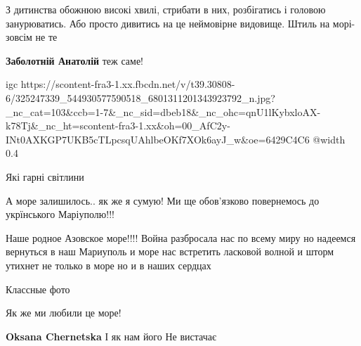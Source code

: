  
 
 
 
 

\qqSecCmt


З дитинства обожнюю високі хвилі, стрибати в них, розбігатись і головою
занурюватись. Або просто дивитись на це неймовірне видовище. Штиль на
морі-зовсім не те

\begin{itemize} %
\textbf{Заболотній Анатолій} теж саме!
\end{itemize} %


\ifcmt
  igc https://scontent-fra3-1.xx.fbcdn.net/v/t39.30808-6/325247339_544930577590518_6801311201343923792_n.jpg?_nc_cat=103&ccb=1-7&_nc_sid=dbeb18&_nc_ohc=qnU1lKybxloAX-k78Tj&_nc_ht=scontent-fra3-1.xx&oh=00_AfC2y-INt0AXKGP7UKB5cTLpcsqUAhlbeOKf7XOk6ayJ_w&oe=6429C4C6
	@width 0.4
\fi


Які гарні світлини


А море залишилось.. як же я сумую! Ми ще обов'язково повернемось до укрїнського Маріуполю!!!


Наше родное Азовское море!!!! Война разбросала нас по всему миру но надеемся
вернуться в наш Мариуполь и море нас встретить ласковой волной и шторм утихнет
не только в море но и в наших сердцах


Классные фото


Як же ми любили це море!

\begin{itemize} %
\textbf{Oksana Chernetska} І як нам його Не вистачає
\end{itemize} %
